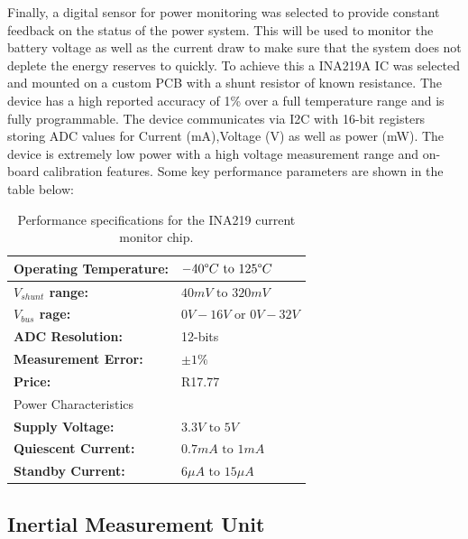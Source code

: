 Finally, a digital sensor for power monitoring was selected to provide constant feedback on the status of the power system. This will be used to monitor the battery voltage as well as the current draw to make sure that the system does not deplete the energy reserves to quickly. To achieve this a INA219A IC was selected and mounted on a custom PCB with a shunt resistor of known resistance. The device has a high reported accuracy of 1\% over a full temperature range and is fully programmable. The device  communicates via I2C with 16-bit registers storing ADC values for  Current (mA),Voltage (V) as well as power (mW). The device is extremely low power with a high voltage measurement range and on-board calibration features. Some key performance parameters are shown in the table below:

\begin{table}[H]
    \centering
    \caption{Performance specifications for the INA219 current monitor chip.}
    \begin{tabular}{|l|l|}
    \hline
         \textbf{Operating Temperature: }& $-40\degree C\text{ to } 125\degree C$ \\
         \hline
         \textbf{$V_{shunt}$ range: }& $40mV \text{ to } 320mV$\\ 
         \hline
         \textbf{$V_{bus}$ rage: } & $0V - 16V \text{ or } 0V-32V$\\
         \hline
         \textbf{ADC Resolution: } & 12-bits\\
         \hline
         \textbf{Measurement Error: } &$\pm 1\%$\\ 
         \hline
         \textbf{Price: } & R17.77\footnotemark\\
         \hline
         \multicolumn{2}{l}{Power Characteristics}\\
         \hline
         \textbf{Supply Voltage: } & $3.3V \text{ to } 5V$\\
         \hline
         \textbf{Quiescent Current: } & $0.7mA \text{ to } 1mA$\\
         \hline
         \textbf{Standby Current: } & $6\mu A \text{ to } 15\mu A$\\
         \hline
    \end{tabular}

    \label{tab:INA_spec}
\end{table}

\subsection{Inertial Measurement Unit}

